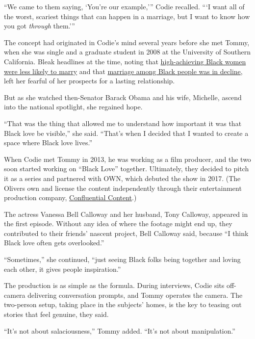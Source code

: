 ``We came to them saying, `You're our example,''' Codie recalled. ```I
want all of the worst, scariest things that can happen in a marriage,
but I want to know how you got \emph{through} them.'''

The concept had originated in Codie's mind several years before she met
Tommy, when she was single and a graduate student in 2008 at the
University of Southern California. Bleak headlines at the time, noting
that
\href{http://www.nbcnews.com/id/32379727/ns/health-sexual_health/t/marriage-eludes-high-achieving-black-women/\#.X0hXfPhKhTZ}{high-achieving
Black women were less likely to marry} and that
\href{https://www.pewsocialtrends.org/2010/01/19/women-men-and-the-new-economics-of-marriage/}{marriage
among Black people was in decline}, left her fearful of her prospects
for a lasting relationship.

But as she watched then-Senator Barack Obama and his wife, Michelle,
ascend into the national spotlight, she regained hope.

``That was the thing that allowed me to understand how important it was
that Black love be visible,'' she said. ``That's when I decided that I
wanted to create a space where Black love lives.''

When Codie met Tommy in 2013, he was working as a film producer, and the
two soon started working on ``Black Love'' together. Ultimately, they
decided to pitch it as a series and partnered with OWN, which debuted
the show in 2017. (The Olivers own and license the content independently
through their entertainment production company,
\href{https://confluentialcontent.com/}{Confluential Content}.)

The actress Vanessa Bell Calloway and her husband, Tony Calloway,
appeared in the first episode. Without any idea of where the footage
might end up, they contributed to their friends' nascent project, Bell
Calloway said, because ``I think Black love often gets overlooked.''

``Sometimes,'' she continued, ``just seeing Black folks being together
and loving each other, it gives people inspiration.''

The production is as simple as the formula. During interviews, Codie
sits off-camera delivering conversation prompts, and Tommy operates the
camera. The two-person setup, taking place in the subjects' homes, is
the key to teasing out stories that feel genuine, they said.

``It's not about salaciousness,'' Tommy added. ``It's not about
manipulation.''

